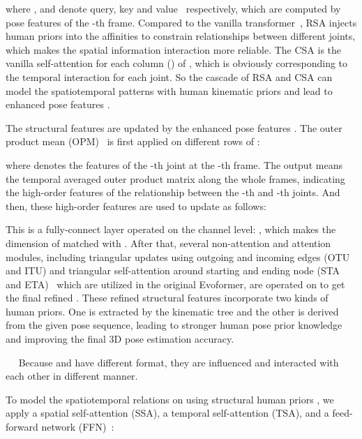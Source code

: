 \documentclass{article}
\begin{document}
where ,  and  denote query, key and value~\cite{vaswani2017attention} respectively, which are computed by pose features  of the -th frame. Compared to the vanilla transformer~\cite{vaswani2017attention}, RSA injects human priors  into the affinities to constrain relationships between different joints, which makes the spatial information interaction more reliable. The CSA is the vanilla self-attention for each column () of , which is obviously corresponding to the temporal interaction for each joint. So the cascade of RSA and CSA can model the spatiotemporal patterns with human kinematic priors and lead to enhanced pose features .



 The structural features  are updated by the enhanced pose features . The outer product mean (OPM)~\cite{jumper2021highly} is first applied on different rows of :

where  denotes the features of the -th joint at the -th frame. The output  means the temporal averaged outer product matrix along the whole  frames, indicating the high-order features of the relationship between the -th and -th joints. And then, these high-order features  are used to update  as follows:

This  is a fully-connect layer operated on the channel level: , which makes the dimension of  matched with . After that, several non-attention and attention modules, including triangular updates using outgoing and incoming edges (OTU and ITU) and triangular self-attention around starting and ending node (STA and ETA)~\cite{jumper2021highly} which are utilized in the original Evoformer, are operated on  to get the final refined . These refined structural features incorporate two kinds of human priors. One is extracted by the kinematic tree and the other is derived from the given pose sequence, leading to stronger human pose prior knowledge and improving the final 3D pose estimation accuracy.\vspace{-0.3em}



\iffalse　
Because  and  have different format, they are influenced and interacted with each other in different manner. 





To model the spatiotemporal relations on  using structural human priors , we apply a spatial self-attention (SSA), a temporal self-attention (TSA), and a feed-forward network (FFN)~\cite{vaswani2017attention}:\setlength\abovedisplayskip{0.1em}
\setlength\belowdisplayskip{0.1em}
\end{document}
